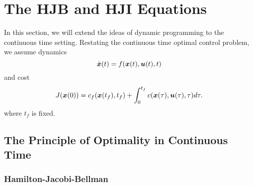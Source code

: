\section{The HJB and HJI Equations}

In this section, we will extend the ideas of dynamic programming to the continuous time setting. Restating the continuous time optimal control problem, we assume dynamics
\begin{equation}
    \dot{\bm{x}}(t) = f(\bm{x}(t),\bm{u}(t),t)
\end{equation}
and cost
\begin{equation}
    J(\bm{x}(0)) = c_f(\bm{x}(t_f),t_f) + \int_0^{t_f} c(\bm{x}(\tau),\bm{u}(\tau),\tau) d\tau.
\end{equation}
where $t_f$ is fixed. 

\subsection{The Principle of Optimality in Continuous Time}

\subsubsection{Hamilton-Jacobi-Bellman}


